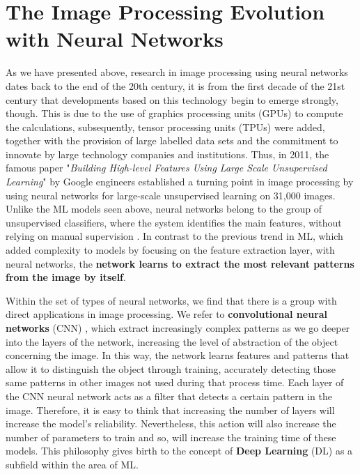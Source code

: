\section{The Image Processing Evolution with Neural Networks}

As we have presented above, research in image processing using neural networks dates back to the end of the 20th century, it is from the first decade of the 21st century that developments based on this technology begin to emerge strongly, though. This is due to the use of graphics processing units (GPUs) to compute the calculations, subsequently, tensor processing units (TPUs) were added, together with the provision of large labelled data sets and the commitment to innovate by large technology companies and institutions. Thus, in 2011, the famous paper "\textit{Building High-level Features Using Large Scale Unsupervised Learning}" \cite{le_building_2012} by Google engineers established a turning point in image processing by using neural networks for large-scale unsupervised learning on 31,000 images. Unlike the ML models seen above, neural networks belong to the group of unsupervised classifiers, where the system identifies the main features, without relying on manual supervision \cite{Le2011BuildingHF}. In contrast to the previous trend in ML, which added complexity to models by focusing on the feature extraction layer, with neural networks, the\textbf{ network learns to extract the most relevant patterns from the image by itself}.

Within the set of types of neural networks, we find that there is a group with direct applications in image processing. We refer to \textbf{convolutional neural networks} (CNN) \cite{shiri_comprehensive_nodate} \cite{chen_review_2021}, which extract increasingly complex patterns as we go deeper into the layers of the network, increasing the level of abstraction of the object concerning the image. In this way, the network learns features and patterns that allow it to distinguish the object through training, accurately detecting those same patterns in other images not used during that process time. Each layer of the CNN neural network acts as a filter that detects a certain pattern in the image. Therefore, it is easy to think that increasing the number of layers will increase the model's reliability. Nevertheless, this action will also increase the number of parameters to train and so, will increase the training time of these models. This philosophy gives birth to the concept of \textbf{Deep Learning }(DL) \cite{noauthor_what_nodate} as a subfield within the area of ML.

